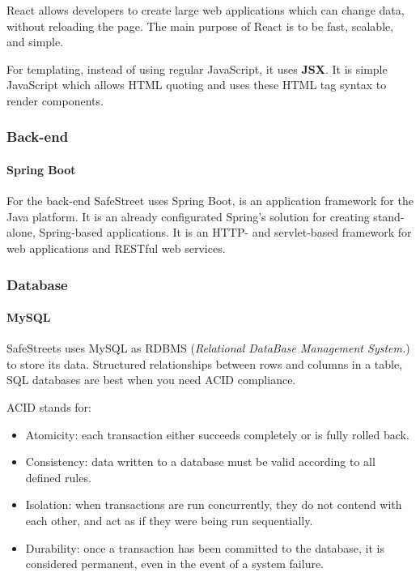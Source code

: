 React allows developers to create large web applications which can change data, without reloading the page. The main purpose of React is to be fast, scalable, and simple.

For templating, instead of using regular JavaScript, it uses \textbf{JSX}. It is simple JavaScript which allows HTML quoting and uses these HTML tag syntax to render components.

\subsubsection{Back-end}

\paragraph{Spring Boot}

For the back-end SafeStreet uses Spring Boot, is an application framework for the Java platform.
It is an already configurated Spring's solution for creating stand-alone, Spring-based applications. It is an HTTP- and servlet-based framework for web applications and RESTful web services.

\subsubsection{Database}

\paragraph{MySQL}

SafeStreets uses MySQL as RDBMS (\textit{Relational DataBase Management System.}) to store its data.
Structured relationships between rows and columns in a table, SQL databases are best when you need ACID compliance. 

ACID stands for:
\begin{itemize}
	\item Atomicity: each transaction either succeeds completely or is fully rolled back.
	\item Consistency: data written to a database must be valid according to all defined rules.
	\item Isolation:  when transactions are run concurrently, they do not contend with each other, and act as if they were being run sequentially.
	\item Durability: once a transaction has been committed to the database, it is considered permanent, even in the event of a system failure.
\end{itemize}






